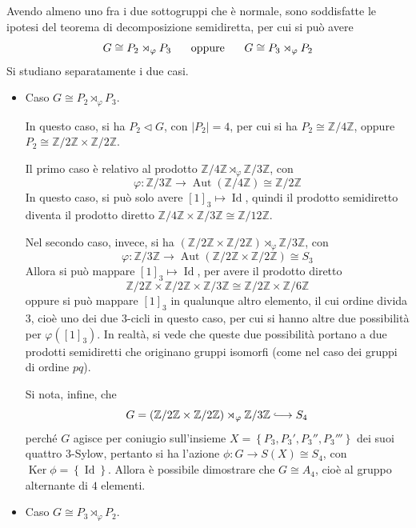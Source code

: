 \documentclass[12pt]{scrartcl}
\theoremstyle{style}
\numberwithin{equation}{subsection}
\newcommand{\longhookrightarrow}{\lhook\joinrel\longrightarrow}
\begin{document}
	Avendo almeno uno fra i due sottogruppi che \`e normale, sono soddisfatte le ipotesi del teorema di decomposizione semidiretta, per cui si pu\`o avere
	\[
	G\cong P_2 \rtimes _\varphi P_3 \hspace{.5cm} \text{ oppure }\hspace{.5cm}G\cong P_3 \rtimes _\varphi P_2
	\] 
	Si studiano separatamente i due casi.
\begin{itemize}
	\item Caso $G \cong P_2 \rtimes _\varphi  P_3$.

		In questo caso, si ha $P_2 \lhd G$, con $\lvert P_2 \rvert =4$, per cui si ha $P_2\cong \mathbb{Z}/4\mathbb{Z}$, oppure $P_2\cong \mathbb{Z}/2\mathbb{Z}\times \mathbb{Z}/2\mathbb{Z}$.

		Il primo caso \`e relativo al prodotto $\mathbb{Z}/4\mathbb{Z} \rtimes _\varphi \mathbb{Z}/3\mathbb{Z}$, con
		\[
			\varphi : \mathbb{Z}/3\mathbb{Z}\longrightarrow \operatorname{Aut} (\mathbb{Z}/4\mathbb{Z}) \cong \mathbb{Z}/2\mathbb{Z}
		\] 
		In questo caso, si pu\`o solo avere $[1]_3 \mapsto \operatorname{Id} $, quindi il prodotto semidiretto diventa il prodotto diretto $\mathbb{Z}/4\mathbb{Z} \times \mathbb{Z}/3\mathbb{Z} \cong \mathbb{Z}/12\mathbb{Z}$.

		Nel secondo caso, invece, si ha $(\mathbb{Z}/2\mathbb{Z} \times \mathbb{Z}/2\mathbb{Z})\rtimes _\varphi  \mathbb{Z}/3\mathbb{Z}$, con
		\[
		\varphi :\mathbb{Z}/3\mathbb{Z} \longrightarrow \operatorname{Aut} (\mathbb{Z}/2\mathbb{Z}\times \mathbb{Z}/2\mathbb{Z})\cong S_3
		\] 
		Allora si pu\`o mappare $[1]_3\mapsto \operatorname{Id} $, per avere il prodotto diretto 
		\[
		\mathbb{Z}/2\mathbb{Z} \times \mathbb{Z}/2\mathbb{Z} \times \mathbb{Z}/3\mathbb{Z} \cong \mathbb{Z}/2\mathbb{Z} \times \mathbb{Z}/6\mathbb{Z}
		\] 
		oppure si pu\`o mappare $[1]_3$ in qualunque altro elemento, il cui ordine divida $3$, cio\`e uno dei due $3$-cicli in questo caso, per cui si hanno altre due possibilit\`a per $\varphi ([1]_3)$.
		In realt\`a, si vede che queste due possibilit\`a portano a due prodotti semidiretti che originano gruppi isomorfi (come nel caso dei gruppi di ordine $pq$).

		Si nota, infine, che 
		\[
		G = (\mathbb{Z}/2\mathbb{Z} \times \mathbb{Z}/2\mathbb{Z})\rtimes _\varphi \mathbb{Z}/3\mathbb{Z} \longhookrightarrow S_4
		\] 
		perch\'e $G$ agisce per coniugio sull'insieme $X=\left\{ P_3,P_3',P_3'',P_3''' \right\} $ dei suoi quattro $3$-Sylow, pertanto si ha l'azione $\phi :G \longrightarrow S(X) \cong S_4$, con $\operatorname{Ker} \phi  = \left\{ \operatorname{Id}  \right\} $.
		Allora \`e possibile dimostrare che $G\cong A_4$, cio\`e al gruppo alternante di $4$ elementi.
	\item Caso $G \cong P_3 \rtimes _\varphi  P_2$.


\end{itemize}
\end{document}

